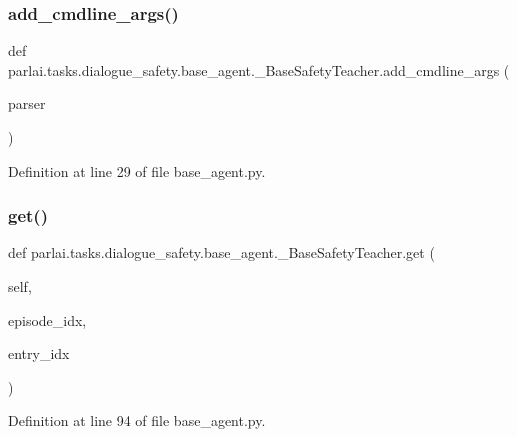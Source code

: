 \subsubsection{\texorpdfstring{add\+\_\+cmdline\+\_\+args()}{add\_cmdline\_args()}}
{\footnotesize\ttfamily def parlai.\+tasks.\+dialogue\+\_\+safety.\+base\+\_\+agent.\+\_\+\+Base\+Safety\+Teacher.\+add\+\_\+cmdline\+\_\+args (\begin{DoxyParamCaption}\item[{}]{parser }\end{DoxyParamCaption})\hspace{0.3cm}{\ttfamily [static]}}



Definition at line 29 of file base\+\_\+agent.\+py.

\mbox{\label{classparlai_1_1tasks_1_1dialogue__safety_1_1base__agent_1_1__BaseSafetyTeacher_afde2a1fdb6fa5aa3da3544624f8068b6}} 
\subsubsection{\texorpdfstring{get()}{get()}}
{\footnotesize\ttfamily def parlai.\+tasks.\+dialogue\+\_\+safety.\+base\+\_\+agent.\+\_\+\+Base\+Safety\+Teacher.\+get (\begin{DoxyParamCaption}\item[{}]{self,  }\item[{}]{episode\+\_\+idx,  }\item[{}]{entry\+\_\+idx }\end{DoxyParamCaption})}



Definition at line 94 of file base\+\_\+agent.\+py.



